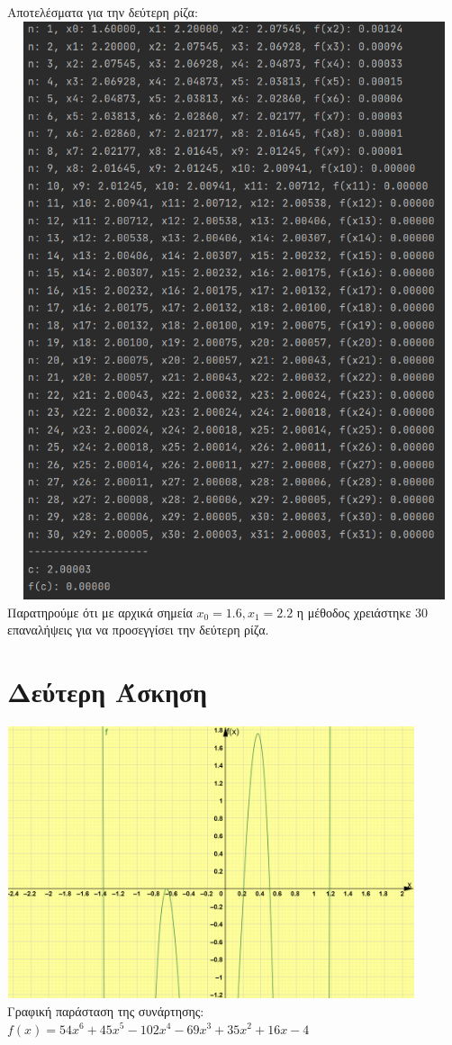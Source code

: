 \documentclass{article}
\begin{document}
\pagebreak
Αποτελέσματα για την δεύτερη ρίζα: \vspace{3mm} \\
\includegraphics[width=14cm, height=17cm]{images/results_6.png} \\

Παρατηρούμε ότι με αρχικά σημεία \(x_0 = 1.6, x_1 = 2.2\) η μέθοδος χρειάστηκε 30 επαναλήψεις για να προσεγγίσει την δεύτερη ρίζα.

\section{Δεύτερη Άσκηση}

\includegraphics[width=12cm, height=8cm]{images/Figure_2.png} \\
Γραφική παράσταση της συνάρτησης: \(f(x) =  54x^6 + 45x^5 - 102x^4 - 69x^3 + 35x^2 + 16x - 4\)
\end{document}
